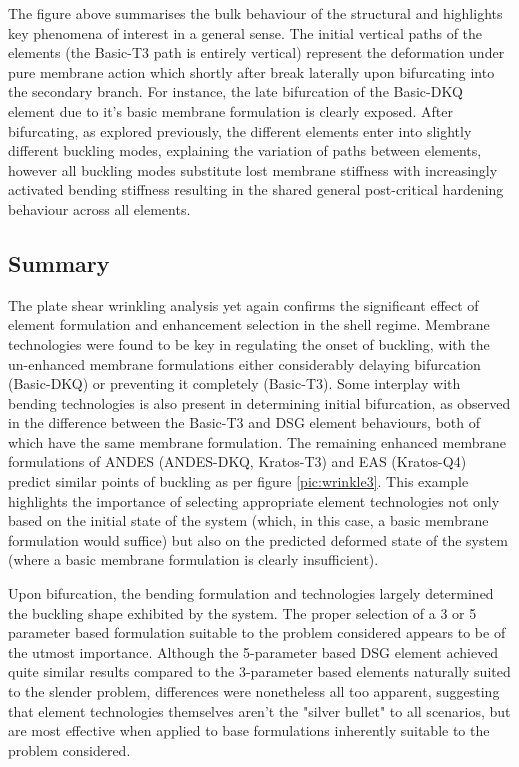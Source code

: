 The figure above summarises the bulk behaviour of the structural and highlights key phenomena of interest in a general sense. The initial vertical paths of the elements (the Basic-T3 path is entirely vertical) represent the deformation under pure membrane action which shortly after break laterally upon bifurcating into the secondary branch. For instance, the late bifurcation of the Basic-DKQ element due to it's basic membrane formulation is clearly exposed. After bifurcating, as explored previously, the different elements enter into slightly different buckling modes, explaining the variation of paths between elements, however all buckling modes substitute lost membrane stiffness with increasingly activated bending stiffness resulting in the shared general post-critical hardening behaviour across all elements.

\subsection{Summary}

The plate shear wrinkling analysis yet again confirms the significant effect of element formulation and enhancement selection in the shell regime. Membrane technologies were found to be key in regulating the onset of buckling, with the un-enhanced membrane formulations either considerably delaying bifurcation (Basic-DKQ) or preventing it completely (Basic-T3). Some interplay with bending technologies is also present in determining initial bifurcation, as observed in the difference between the Basic-T3 and DSG element behaviours, both of which have the same membrane formulation. The remaining enhanced membrane formulations of ANDES (ANDES-DKQ, Kratos-T3) and EAS (Kratos-Q4) predict similar points of buckling as per figure \ref{pic:wrinkle3}. This example highlights the importance of selecting appropriate element technologies not only based on the initial state of the system (which, in this case, a basic membrane formulation would suffice) but also on the predicted deformed state of the system (where a basic membrane formulation is clearly insufficient).

 Upon bifurcation, the bending formulation and technologies largely determined the buckling shape exhibited by the system. The proper selection of a 3 or 5 parameter based formulation suitable to the problem considered appears to be of the utmost importance. Although the 5-parameter based DSG element achieved quite similar results compared to the 3-parameter based elements naturally suited to the slender problem, differences were nonetheless all too apparent, suggesting that element technologies themselves aren't the "silver bullet" to all scenarios, but are most effective when applied to base formulations inherently suitable to the problem considered.
 

